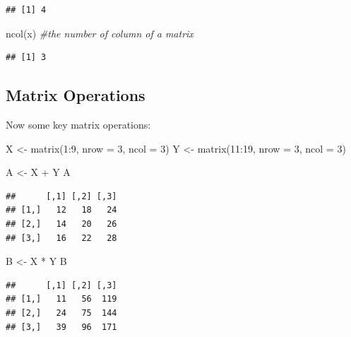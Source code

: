 \documentclass[
]{book}
\newenvironment{Shaded}{\begin{snugshade}}{\end{snugshade}}
\newcommand{\AttributeTok}[1]{\textcolor[rgb]{0.77,0.63,0.00}{#1}}
\newcommand{\CommentTok}[1]{\textcolor[rgb]{0.56,0.35,0.01}{\textit{#1}}}
\newcommand{\DecValTok}[1]{\textcolor[rgb]{0.00,0.00,0.81}{#1}}
\newcommand{\FunctionTok}[1]{\textcolor[rgb]{0.00,0.00,0.00}{#1}}
\newcommand{\NormalTok}[1]{#1}
\newcommand{\OtherTok}[1]{\textcolor[rgb]{0.56,0.35,0.01}{#1}}
\newcommand{\SpecialCharTok}[1]{\textcolor[rgb]{0.00,0.00,0.00}{#1}}
\begin{document}
\begin{verbatim}
## [1] 4
\end{verbatim}

\begin{Shaded}
\begin{Highlighting}[]
\FunctionTok{ncol}\NormalTok{(x)           }\CommentTok{\#the number of column of a matrix }
\end{Highlighting}
\end{Shaded}

\begin{verbatim}
## [1] 3
\end{verbatim}

\hypertarget{matrix-operations}{%
\subsection{Matrix Operations}\label{matrix-operations}}

Now some key matrix operations:

\begin{Shaded}
\begin{Highlighting}[]
\NormalTok{X }\OtherTok{\textless{}{-}} \FunctionTok{matrix}\NormalTok{(}\DecValTok{1}\SpecialCharTok{:}\DecValTok{9}\NormalTok{, }\AttributeTok{nrow =} \DecValTok{3}\NormalTok{, }\AttributeTok{ncol =} \DecValTok{3}\NormalTok{)}
\NormalTok{Y }\OtherTok{\textless{}{-}} \FunctionTok{matrix}\NormalTok{(}\DecValTok{11}\SpecialCharTok{:}\DecValTok{19}\NormalTok{, }\AttributeTok{nrow =} \DecValTok{3}\NormalTok{, }\AttributeTok{ncol =} \DecValTok{3}\NormalTok{)}

\NormalTok{A }\OtherTok{\textless{}{-}}\NormalTok{ X }\SpecialCharTok{+}\NormalTok{ Y}
\NormalTok{A}
\end{Highlighting}
\end{Shaded}

\begin{verbatim}
##      [,1] [,2] [,3]
## [1,]   12   18   24
## [2,]   14   20   26
## [3,]   16   22   28
\end{verbatim}

\begin{Shaded}
\begin{Highlighting}[]
\NormalTok{B }\OtherTok{\textless{}{-}}\NormalTok{ X }\SpecialCharTok{*}\NormalTok{ Y}
\NormalTok{B}
\end{Highlighting}
\end{Shaded}

\begin{verbatim}
##      [,1] [,2] [,3]
## [1,]   11   56  119
## [2,]   24   75  144
## [3,]   39   96  171
\end{verbatim}
\end{document}
